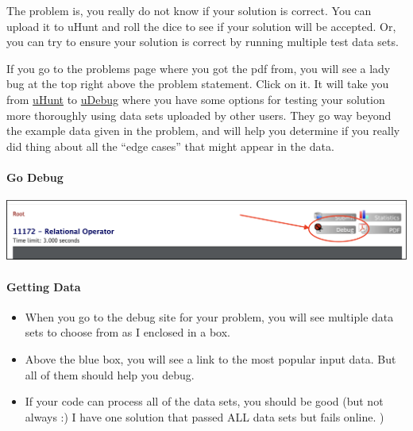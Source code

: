 The problem is, you really do not know if your solution is correct. You
can upload it to uHunt and roll the dice to see if your solution will be
accepted. Or, you can try to ensure your solution is correct by running
multiple test data sets.

If you go to the problems page where you got the pdf from, you will see
a lady bug at the top right above the problem statement. Click on it. It
will take you from
\href{https://onlinejudge.org/index.php?option=com_onlinejudge\&Itemid=8\&category=24\&page=show_problem\&problem=2113}{uHunt}
to \href{https://www.udebug.com/UVa/11172}{uDebug} where you have some
options for testing your solution more thoroughly using data sets
uploaded by other users. They go way beyond the example data given in
the problem, and will help you determine if you really did thing about
all the ``edge cases'' that might appear in the data.

\hypertarget{go-debug}{%
\paragraph{Go Debug}\label{go-debug}}


\begin{center}
\includegraphics[scale=.4]{images/replit_debug_sp_2020.png}
\end{center}

\hypertarget{getting-data}{%
\paragraph{Getting Data}\label{getting-data}}

\begin{itemize}
\tightlist
\item
  When you go to the debug site for your problem, you will see multiple
  data sets to choose from as I enclosed in a box.
\item
  Above the blue box, you will see a link to the most popular input
  data. But all of them should help you debug.
\item
  If your code can process all of the data sets, you should be good (but
  not always :) I have one solution that passed ALL data sets but fails
  online. )
\end{itemize}

